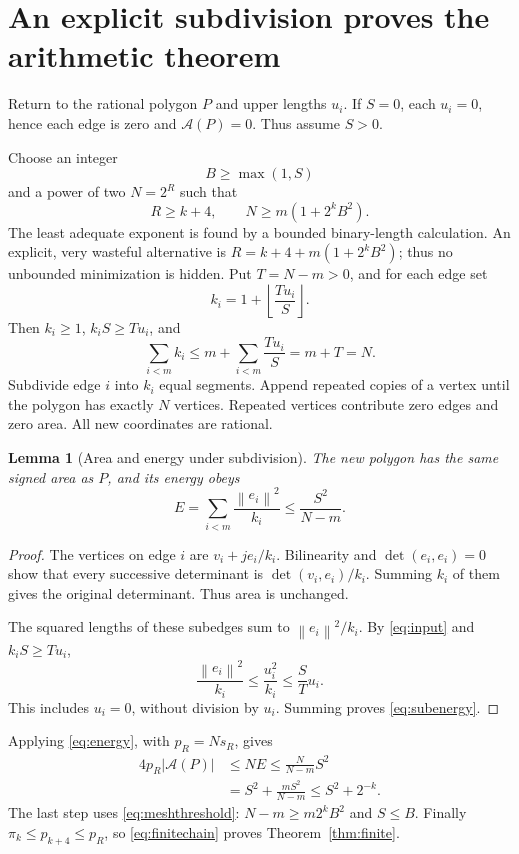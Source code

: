 \documentclass[11pt,a4paper]{article}
\newtheorem{lemma}[theorem]{Lemma}
\theoremstyle{definition}
\newcommand{\norm}[1]{\left\|#1\right\|}
\newcommand{\Area}{\mathcal A}
\begin{document}
\section{An explicit subdivision proves the arithmetic theorem}
\label{sec:subdivision}
Return to the rational polygon \(P\) and upper lengths \(u_i\).
If \(S=0\), each \(u_i=0\), hence each edge is zero and
\(\Area(P)=0\). Thus assume \(S>0\).

Choose an integer
\[
 B\ge\max(1,S)
\]
and a power of two \(N=2^R\) such that
\[
 R\ge k+4,\qquad N\ge m(1+2^kB^2).
 \tag{6.1}\label{eq:meshthreshold}
\]
The least adequate exponent is found by a bounded binary-length
calculation. An explicit, very wasteful alternative is
\(R=k+4+m(1+2^kB^2)\); thus no unbounded minimization is hidden.
Put \(T=N-m>0\), and for each edge set
\[
 k_i=1+\left\lfloor\frac{Tu_i}{S}\right\rfloor.
 \tag{6.2}\label{eq:subcount}
\]
Then \(k_i\ge1\), \(k_iS\ge Tu_i\), and
\[
 \sum_{i<m}k_i
 \le m+\sum_{i<m}\frac{Tu_i}{S}=m+T=N.
 \tag{6.3}\label{eq:subbudget}
\]
Subdivide edge \(i\) into \(k_i\) equal segments. Append repeated
copies of a vertex until the polygon has exactly \(N\) vertices.
Repeated vertices contribute zero edges and zero area. All new
coordinates are rational.

\begin{lemma}[Area and energy under subdivision]\label{lem:refinement}
The new polygon has the same signed area as \(P\), and its energy obeys
\[
 E=\sum_{i<m}\frac{\norm{e_i}^2}{k_i}
 \le\frac{S^2}{N-m}.
 \tag{6.4}\label{eq:subenergy}
\]
\end{lemma}
\begin{proof}
The vertices on edge \(i\) are \(v_i+je_i/k_i\).
Bilinearity and \(\det(e_i,e_i)=0\) show that every successive
determinant is \(\det(v_i,e_i)/k_i\). Summing \(k_i\) of them
gives the original determinant. Thus area is unchanged.

The squared lengths of these subedges sum to
\(\norm{e_i}^2/k_i\). By \eqref{eq:input} and \(k_iS\ge Tu_i\),
\[
 \frac{\norm{e_i}^2}{k_i}
 \le\frac{u_i^2}{k_i}
 \le\frac{S}{T}u_i.
\]
This includes \(u_i=0\), without division by \(u_i\).
Summing proves \eqref{eq:subenergy}.
\end{proof}

Applying \eqref{eq:energy}, with \(p_R=Ns_R\), gives
\[
 \begin{aligned}
 4p_R|\Area(P)|
 &\le NE
 \le\frac{N}{N-m}S^2\\
 &=S^2+\frac{mS^2}{N-m}
 \le S^2+2^{-k}.
 \end{aligned}
 \tag{6.5}\label{eq:finitechain}
\]
The last step uses \eqref{eq:meshthreshold}:
\(N-m\ge m2^kB^2\) and \(S\le B\).
Finally \(\pi_k\le p_{k+4}\le p_R\), so
\eqref{eq:finitechain} proves Theorem~\ref{thm:finite}.
\end{document}
